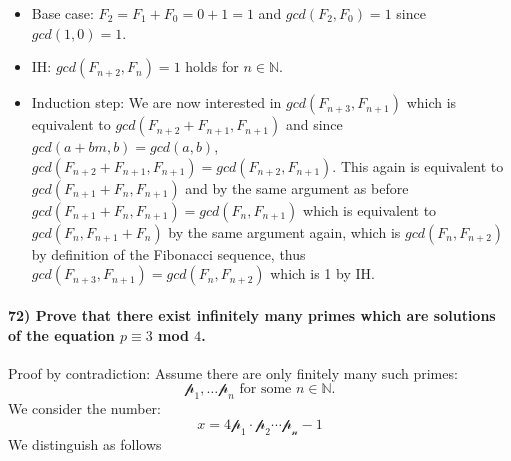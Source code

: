 \documentclass[
]{article}
\begin{document}
\begin{itemize}
\item
  Base case: \(F_2 = F_1 + F_0 = 0 + 1 = 1\) and \(gcd(F_2, F_0) = 1\)
  since \(gcd(1,0) = 1\).
\item
  IH: \(gcd(F_{n+2}, F_n) = 1\) holds for \(n \in \mathbb{N}\).
\item
  Induction step: We are now interested in \(gcd(F_{n+3}, F_{n+1})\)
  which is equivalent to \(gcd(F_{n+2} + F_{n+1}, F_{n+1})\) and since
  \(gcd(a+bm, b) = gcd(a,b)\),
  \(gcd(F_{n+2} + F_{n+1}, F_{n+1}) = gcd(F_{n+2}, F_{n+1})\). This
  again is equivalent to \(gcd(F_{n+1} + F_{n}, F_{n+1})\) and by the
  same argument as before
  \(gcd(F_{n+1} + F_{n}, F_{n+1}) = gcd(F_n, F_{n+1})\) which is
  equivalent to \(gcd(F_n, F_{n+1} + F_n)\) by the same argument again,
  which is \(gcd(F_n, F_{n+2})\) by definition of the Fibonacci
  sequence, thus \(gcd(F_{n+3},F_{n+1}) = gcd(F_n, F_{n+2})\) which is 1
  by IH.
\end{itemize}

\hypertarget{prove-that-there-exist-infinitely-many-primes-which-are-solutions-of-the-equation-p-equiv-3-mod-4.}{%
\paragraph{\texorpdfstring{72) Prove that there exist infinitely many
primes which are solutions of the equation \(p \equiv 3\) mod
\(4\).}{72) Prove that there exist infinitely many primes which are solutions of the equation p \textbackslash equiv 3 mod 4.}}\label{prove-that-there-exist-infinitely-many-primes-which-are-solutions-of-the-equation-p-equiv-3-mod-4.}}

Proof by contradiction: Assume there are only finitely many such primes:
\[
\mathcal{p}_1, \dots \mathcal{p}_n \text{ for some } n \in \mathbb{N}. 
\] We consider the number: \[
x = 4\mathcal{p_1}\cdot \mathcal{p}_2 \cdots \mathcal{p_n} -1
\] We distinguish as follows
\end{document}
